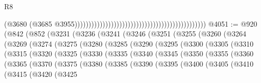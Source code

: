 \begin{lexlean}{R8}
\begin{coremodule}
                                                                                              (@3680
                                                                                                (@3685
                                                                                                  @3955)))))))))))))))))))))))))))))))))))))))))))))))
@4051 := @920
    (@842
      (@852
        (@3231
          (@3236
            (@3241
              (@3246
                (@3251
                  (@3255
                    (@3260
                      (@3264
                        (@3269
                          (@3274
                            (@3275
                              (@3280
                                (@3285
                                  (@3290
                                    (@3295
                                      (@3300
                                        (@3305
                                          (@3310
                                            (@3315
                                              (@3320
                                                (@3325
                                                  (@3330
                                                    (@3335
                                                      (@3340
                                                        (@3345
                                                          (@3350
                                                            (@3355
                                                              (@3360
                                                                (@3365
                                                                  (@3370
                                                                    (@3375
                                                                      (@3380
                                                                        (@3385
                                                                          (@3390
                                                                            (@3395
                                                                              (@3400
                                                                                (@3405
                                                                                  (@3410
                                                                                    (@3415
                                                                                      (@3420
                                                                                        (@3425

\end{coremodule}
\end{lexlean}
